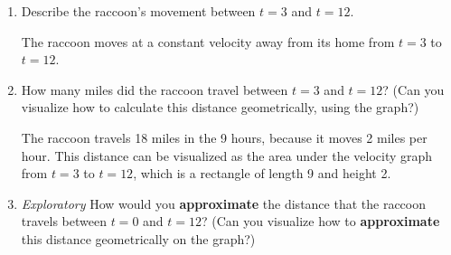 \documentclass{article}
\begin{document}
\begin{enumerate}
 \begin{center}
      \end{center}

\begin{enumerate}
\item Describe the raccoon's movement between $t=3$ and $t=12$. 

\begin{solution}
    The raccoon moves at a constant velocity away from its home from $t=3$ to $t=12$.
\end{solution}
\vfill 
\item How many miles did the raccoon travel between $t=3$ and $t=12$? (Can you visualize how to calculate this distance geometrically, using the graph?)

\begin{solution}
    The raccoon travels 18 miles in the 9 hours, because it moves 2 miles per hour. This distance can be visualized as the area under the velocity graph from $t=3$ to $t=12$, which is a rectangle of length 9 and height 2.
\end{solution}
\vfill \vfill
\item \textit{Exploratory} How would you \textbf{approximate} the distance that the raccoon travels between $t=0$ and $t=12$? (Can you visualize how to \textbf{approximate} this distance geometrically on the graph?)


\end{enumerate}
\end{enumerate}
\end{document}
